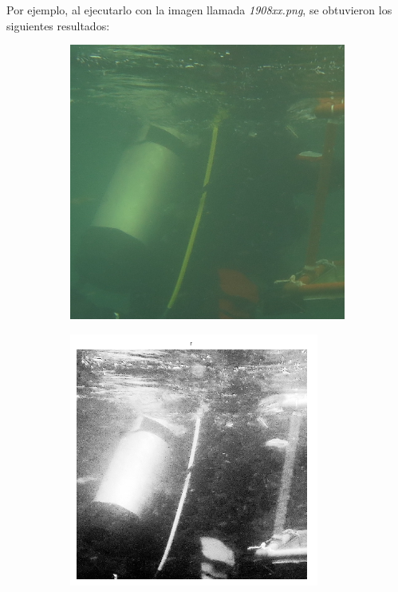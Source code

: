 \documentclass{article}
\begin{document}
Por ejemplo, al ejecutarlo con la imagen llamada \textit{1908xx.png}, se obtuvieron los siguientes resultados:

\begin{figure}[H]
	\begin{subfigure}{0.5\textwidth}
	\centering
        \includegraphics[scale=0.5]{1908xx.png}
    \end{subfigure}\hfill
	\begin{subfigure}{0.5\textwidth}
	\centering
        \includegraphics[width=0.9\textwidth]{1908xx-ecualizacion-r.png}

\end{subfigure}
\end{figure}
\end{document}
